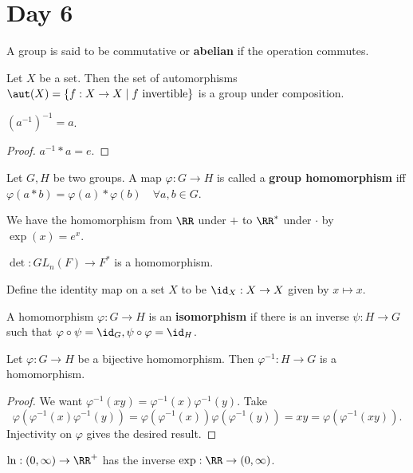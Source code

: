 \section{Day 6}

\begin{df}
A group is said to be commutative or \textbf{abelian} if the operation
commutes.
\end{df}

\begin{ex}
Let $X$ be a set. Then the set of automorphisms $\aut(X) = \lbrace f : X
\to X \mid f \textrm{ invertible} \rbrace$ is a group under composition.
\end{ex}

\begin{prop}
$(a^{-1})^{-1} = a$.
\end{prop}

\begin{proof}
$a^{-1} * a = e$.
\end{proof}

\begin{df}
Let $G, H$ be two groups. A map $\varphi : G \to H$ is called a
\textbf{group homomorphism} iff $\varphi(a * b) = \varphi(a) *
\varphi(b) \quad \forall a, b \in G$.
\end{df}

\begin{ex}
We have the homomorphism from $\RR$ under $+$ to $\RR^*$ under $\cdot$
by $\exp(x) = e^x$.
\end{ex}

\begin{ex}
$\det : GL_n(F) \to F^*$ is a homomorphism.
\end{ex}

\begin{df}
Define the identity map on a set $X$ to be $\id_X : X \to X$ given by $x
\mapsto x$.
\end{df}

\begin{df}
A homomorphism $\varphi : G \to H$ is an \textbf{isomorphism} if there
is an inverse $\psi : H \to G$ such that $\varphi \circ \psi = \id_G,
\psi \circ \varphi = \id_H$.
\end{df}

\begin{prop}
Let $\varphi : G \to H$ be a bijective homomorphism. Then $\varphi^{-1}
: H \to G$ is a homomorphism.
\end{prop}

\begin{proof}
We want $\varphi^{-1}(xy) = \varphi^{-1}(x) \varphi^{-1}(y)$. Take
\[ \varphi(\varphi^{-1}(x) \varphi^{-1}(y)) = \varphi(\varphi^{-1}(x))
\varphi(\varphi^{-1}(y)) = xy = \varphi(\varphi^{-1}(xy)). \]
Injectivity on $\varphi$ gives the desired result.
\end{proof}

\begin{ex}
$\ln : (0, \infty) \to \RR^+$ has the inverse $\exp : \RR \to (0,
\infty)$.
\end{ex}

